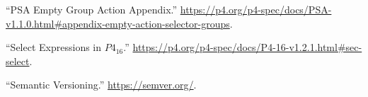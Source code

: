 \documentclass[11pt]{article}
\begin{document}
{{\begin{thebibliography}{45}
\mdbibitemlabel{{}[30]}\textquotedblleft{}PSA Empty Group Action Appendix.\textquotedblright{} \href{https://p4.org/p4-spec/docs/PSA-v1.1.0.html\%23appendix-empty-action-selector-groups}{{\ttfamily https://\hspace{0pt}p4.\hspace{0pt}org/\hspace{0pt}p4-\hspace{0pt}spec/\hspace{0pt}docs/\hspace{0pt}PSA-\hspace{0pt}v1.\hspace{0pt}1.\hspace{0pt}0.\hspace{0pt}html\#\hspace{0pt}appendix-\hspace{0pt}empty-\hspace{0pt}action-\hspace{0pt}selector-\hspace{0pt}groups}}.\label{psaemptygroupactionappendix}%

\mdbibitemlabel{{}[31]}\textquotedblleft{}Select Expressions in $P4_{16}$.\textquotedblright{} \href{https://p4.org/p4-spec/docs/P4-16-v1.2.1.html\%23sec-select}{{\ttfamily https://\hspace{0pt}p4.\hspace{0pt}org/\hspace{0pt}p4-\hspace{0pt}spec/\hspace{0pt}docs/\hspace{0pt}P4-\hspace{0pt}16-\hspace{0pt}v1.\hspace{0pt}2.\hspace{0pt}1.\hspace{0pt}html\#\hspace{0pt}sec-\hspace{0pt}select}}.\label{p4selectexpr}%

\mdbibitemlabel{{}[32]}\textquotedblleft{}Semantic Versioning.\textquotedblright{} \href{https://semver.org/}{{\ttfamily https://\hspace{0pt}semver.\hspace{0pt}org/\hspace{0pt}}}.\label{semver}%


\end{thebibliography}}}
\end{document}
